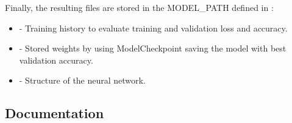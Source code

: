 \documentclass[letterpaper,10pt,english]{sphinxmanual}
\begin{document}
Finally, the resulting files are stored in the MODEL\_PATH defined in :
\begin{itemize}
\item {} 
 - Training history to evaluate training and validation loss and accuracy.

\item {} 
 - Stored weights by using ModelCheckpoint saving the model with best validation accuracy.

\item {} 
 - Structure of the neural network.

\end{itemize}


\subsection{Documentation}
\label{\detokenize{train:documentation}}\label{\detokenize{train:module-train}}
\end{document}
